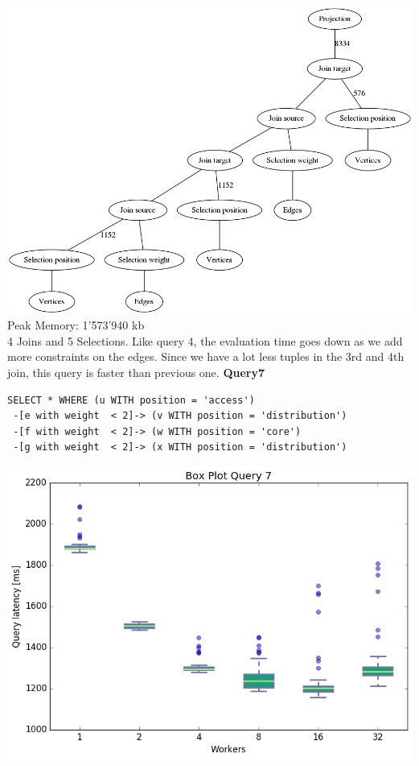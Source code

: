 \documentclass[11pt,singlecolumn]{scrartcl}
\begin{document}
\includegraphics[width=1\textwidth]{graph6}
Peak Memory: 1'573'940 kb \\
4 Joins and 5 Selections. Like query 4, the evaluation time goes down as we add more constraints on the edges. Since we have a lot less tuples in the 3rd and 4th join, this query is faster than previous one.
\clearpage
\textbf{Query7}\\
\begin{verbatim}
SELECT * WHERE (u WITH position = 'access')
 -[e with weight  < 2]-> (v WITH position = 'distribution')
 -[f with weight  < 2]-> (w WITH position = 'core')
 -[g with weight  < 2]-> (x WITH position = 'distribution')\end{verbatim}
\includegraphics[width=1\textwidth]{box7}
\end{document}
